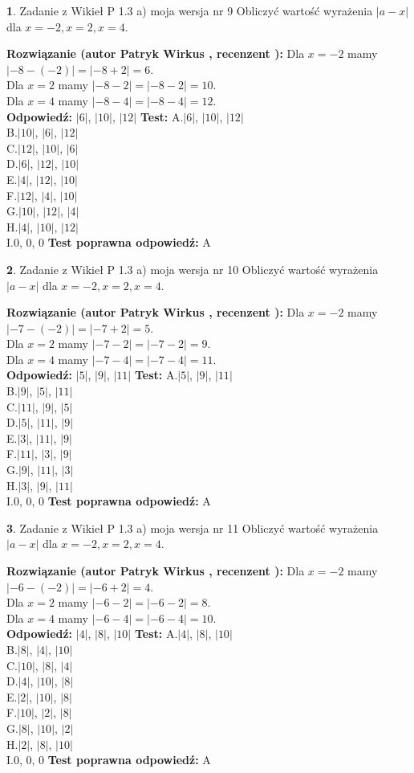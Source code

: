 \documentclass[12pt, a4paper]{article}
\theoremstyle{definition} %
\newtheorem{zad}{}
\newcommand{\zadStart}[1]{\begin{zad}#1\newline}
\newcommand{\zadStop}{\end{zad}}
\newcommand{\rozwStart}[2]{\noindent \textbf{Rozwiązanie (autor #1 , recenzent #2): }\newline}
\newcommand{\rozwStop}{\newline}
\newcommand{\odpStart}{\noindent \textbf{Odpowiedź:}\newline}
\newcommand{\odpStop}{\newline}
\newcommand{\testStart}{\noindent \textbf{Test:}\newline}
\newcommand{\testStop}{\newline}
\newcommand{\kluczStart}{\noindent \textbf{Test poprawna odpowiedź:}\newline}
\newcommand{\kluczStop}{\newline}
\begin{document}
\zadStart{Zadanie z Wikieł P 1.3 a) moja wersja nr 9}
Obliczyć wartość wyrażenia $|a - x|$ dla $x=-2,x=2,x=4$.
\zadStop
\rozwStart{Patryk Wirkus}{}
Dla $x = -2$ mamy $|-8 - (-2)| = |-8 + 2| = 6$.\\
Dla $x = 2$ mamy $|-8 - 2| = |-8 - 2| = 10$.\\
Dla $x = 4$ mamy $|-8 - 4| = |-8 - 4| = 12$.\\
\rozwStop
\odpStart
$|6|$, $|10|$, $|12|$
\odpStop
\testStart
A.$|6|$, $|10|$, $|12|$\\
B.$|10|$, $|6|$, $|12|$\\
C.$|12|$, $|10|$, $|6|$\\
D.$|6|$, $|12|$, $|10|$\\
E.$|4|$, $|12|$, $|10|$\\
F.$|12|$, $|4|$, $|10|$\\
G.$|10|$, $|12|$, $|4|$\\
H.$|4|$, $|10|$, $|12|$\\
I.$0$, $0$, $0$
\testStop
\kluczStart
A
\kluczStop



\zadStart{Zadanie z Wikieł P 1.3 a) moja wersja nr 10}
Obliczyć wartość wyrażenia $|a - x|$ dla $x=-2,x=2,x=4$.
\zadStop
\rozwStart{Patryk Wirkus}{}
Dla $x = -2$ mamy $|-7 - (-2)| = |-7 + 2| = 5$.\\
Dla $x = 2$ mamy $|-7 - 2| = |-7 - 2| = 9$.\\
Dla $x = 4$ mamy $|-7 - 4| = |-7 - 4| = 11$.\\
\rozwStop
\odpStart
$|5|$, $|9|$, $|11|$
\odpStop
\testStart
A.$|5|$, $|9|$, $|11|$\\
B.$|9|$, $|5|$, $|11|$\\
C.$|11|$, $|9|$, $|5|$\\
D.$|5|$, $|11|$, $|9|$\\
E.$|3|$, $|11|$, $|9|$\\
F.$|11|$, $|3|$, $|9|$\\
G.$|9|$, $|11|$, $|3|$\\
H.$|3|$, $|9|$, $|11|$\\
I.$0$, $0$, $0$
\testStop
\kluczStart
A
\kluczStop



\zadStart{Zadanie z Wikieł P 1.3 a) moja wersja nr 11}
Obliczyć wartość wyrażenia $|a - x|$ dla $x=-2,x=2,x=4$.
\zadStop
\rozwStart{Patryk Wirkus}{}
Dla $x = -2$ mamy $|-6 - (-2)| = |-6 + 2| = 4$.\\
Dla $x = 2$ mamy $|-6 - 2| = |-6 - 2| = 8$.\\
Dla $x = 4$ mamy $|-6 - 4| = |-6 - 4| = 10$.\\
\rozwStop
\odpStart
$|4|$, $|8|$, $|10|$
\odpStop
\testStart
A.$|4|$, $|8|$, $|10|$\\
B.$|8|$, $|4|$, $|10|$\\
C.$|10|$, $|8|$, $|4|$\\
D.$|4|$, $|10|$, $|8|$\\
E.$|2|$, $|10|$, $|8|$\\
F.$|10|$, $|2|$, $|8|$\\
G.$|8|$, $|10|$, $|2|$\\
H.$|2|$, $|8|$, $|10|$\\
I.$0$, $0$, $0$
\testStop
\kluczStart
A
\kluczStop
\end{document}
